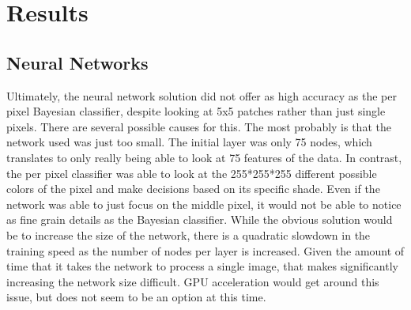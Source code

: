 \documentclass[12pt]{article}
\begin{document}
	
\section{Results}
	\subsection{Neural Networks}
	Ultimately, the neural network solution did not offer as high accuracy as the per pixel Bayesian classifier, despite looking at 5x5 patches rather than just single pixels.  There are several possible causes for this.  The most probably is that the network used was just too small.  The initial layer was only 75 nodes, which translates to only really being able to look at 75 features of the data.  In contrast, the per pixel classifier was able to look at the 255*255*255 different possible colors of the pixel and make decisions based on its specific shade.  Even if the network was able to just focus on the middle pixel, it would not be able to notice as fine grain details as the Bayesian classifier.  While the obvious solution would be to increase the size of the network, there is a quadratic slowdown in the training speed as the number of nodes per layer is increased.  Given the amount of time that it takes the network to process a single image, that makes significantly increasing the network size difficult.  GPU acceleration would get around this issue, but does not seem to be an option at this time.
\end{document}
